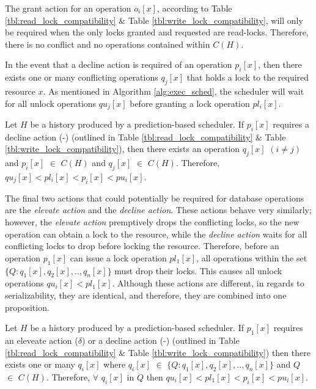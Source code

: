 The grant action for an operation $o_{i}[x]$, according to Table \ref{tbl:read_lock_compatibility} \& Table \ref{tbl:write_lock_compatibility}, will only be required when the only locks granted and requested are read-locks. Therefore, there is no conflict and no operations contained within $C(H)$.

In the event that a decline action is required of an operation $p_{i}[x]$, then there exists one or many conflicting operations $q_{j}[x]$ that holds a lock to the required resource $x$. As mentioned in Algorithm \ref{alg:exec_sched}, the scheduler will wait for all unlock operations $qu_{j}[x]$ before granting a lock operation $pl_{i}[x]$.

\begin{proposition}
\label{prop:decline}
Let $H$ be a history produced by  a prediction-based scheduler. If $p_{i}[x]$ requires a decline action (-) (outlined in Table \ref{tbl:read_lock_compatibility} \& Table \ref{tbl:write_lock_compatibility}), then there exists an operation $q_{j}[x]$ $(i \neq j)$ and $p_{i}[x]$ $\in$ $C(H)$ and $q_{j}[x]$ $\in$ $C(H)$. Therefore, $qu_{j}[x] < pl_{i}[x] < p_{i}[x] < pu_{i}[x]$.
\end{proposition}

The final two actions that could potentially be required for database operations are the \textit{elevate action} and the \textit{decline action}. These actions behave very similarly; however, the \textit{elevate action} premptively drops the conflicting locks, so the new operation can obtain a lock to the resource, while the \textit{decline action} waits for all conflicting locks to drop before locking the resource. Therefore, before an operation $p_{1}[x]$ can issue a lock operation $pl_{1}[x]$, all operations within the set $\{Q:q_{1}[x],q_{2}[x],..,q_{n}[x]\}$ must drop their locks. This causes all unlock operations $qu_{i}[x] < pl_{1}[x]$. Although these actions are different, in regards to serializability, they are identical, and therefore, they are combined into one proposition. 

\begin{proposition}
\label{prop:elevate_decline}
Let $H$ be a history produced by a prediction-based scheduler. If $p_{1}[x]$ requires an eleveate action ($\delta$) or a decline action (-) (outlined in Table \ref{tbl:read_lock_compatibility} \& Table \ref{tbl:write_lock_compatibility}) then there exists one or many $q_{i}[x]$ where $q_{i}[x]$ $\in$ $\{Q:q_{1}[x],q_{2}[x],..,q_{n}[x]\}$ and $Q$ $\in$ $C(H)$. Therefore, $\forall$ $q_{i}[x]$ in $Q$ then $qu_{i}[x] < pl_{1}[x] < p_{i}[x] < pu_{i}[x]$.
\end{proposition}

